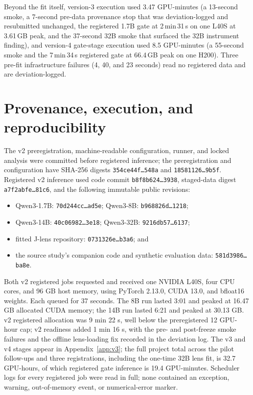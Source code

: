 \documentclass{article}
\newcommand{\jlens}{J-lens}
\begin{document}
Beyond the fit itself, version-3 execution used 3.47 GPU-minutes (a 13-second smoke, a
7-second pre-data provenance stop that was deviation-logged and resubmitted unchanged,
the registered 1.7B gate at 2\,min\,31\,s on one L40S at 3.61\,GB peak, and the
37-second 32B smoke that surfaced the 32B instrument finding), and version-4
gate-stage execution used 8.5 GPU-minutes (a 55-second smoke and the 7\,min\,34\,s
registered gate at 66.4\,GB peak on one H200). Three pre-fit infrastructure failures (4,
40, and 23 seconds) read no registered data and are deviation-logged.

\section{Provenance, execution, and reproducibility}
\label{app:provenance}

The v2 preregistration, machine-readable configuration, runner, and locked analysis were
committed before registered inference; the preregistration and configuration have SHA-256
digests \texttt{354ce44f\ldots{}548a} and \texttt{18581126\ldots{}9b5f}. Registered v2
inference used code commit \texttt{b8f8b624\ldots{}3938}, staged-data digest
\texttt{a7f2abfe\ldots{}81c6}, and the following immutable public revisions:
\begin{itemize}
  \item Qwen3-1.7B: \texttt{70d244cc\ldots{}ad5e}; Qwen3-8B: \texttt{b968826d\ldots{}1218};
  \item Qwen3-14B: \texttt{40c06982\ldots{}3e18}; Qwen3-32B: \texttt{9216db57\ldots{}6137};
  \item fitted \jlens{} repository: \texttt{0731326e\ldots{}b3a6}; and
  \item the source study's companion code and synthetic evaluation data:
    \texttt{581d3986\ldots{}ba8e}.
\end{itemize}

Both v2 registered jobs requested and received one NVIDIA L40S, four CPU cores, and 96 GB
host memory, using PyTorch 2.13.0, CUDA 13.0, and bfloat16 weights. Each queued for 37
seconds. The 8B run lasted 3:01 and peaked at 16.47 GB allocated CUDA memory; the 14B run
lasted 6:21 and peaked at 30.13 GB. v2 registered allocation was 9 min 22 s, well below
the preregistered 12 GPU-hour cap; v2 readiness added 1 min 16 s, with the pre- and
post-freeze smoke failures and the offline lens-loading fix recorded in the deviation
log. The v3 and v4 stages appear in Appendix~\ref{app:v3}; the full project total across
the pilot follow-ups and three registrations, including the one-time 32B lens fit, is
32.7 GPU-hours, of which registered gate inference is 19.4 GPU-minutes. Scheduler logs for every registered job
were read in full; none contained an exception, warning, out-of-memory event, or
numerical-error marker.
\end{document}
